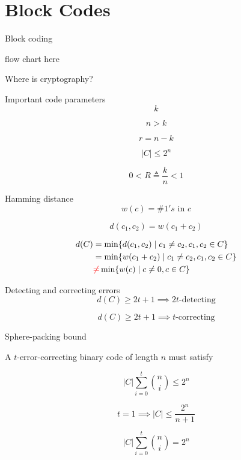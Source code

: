 \section{Block Codes}

\begin{frame}{Block coding}
  \centerline{flow chart here}

  \centerline{Where is cryptography?}
\end{frame}
\begin{frame}{Important code parameters}
  \[
	k
  \]

  \[
	n > k
  \]

  \[
	r = n - k
  \]

  \[
	|C| \le 2^n
  \]

  \[
	0 < R \triangleq \frac{k}{n} < 1
  \]
\end{frame}
\begin{frame}{Hamming distance}
  \[
	w(c) = \# 1's \text{ in } c
  \]

  \[
	d(c_1, c_2) = w(c_1 + c_2)
  \]

  \[
	\begin{aligned}
	  d(C) &= \min \{d(c_1, c_2) \mid c_1 \neq c_2, c_1, c_2 \in C\} \\
	  &= \min \{w(c_1 + c_2) \mid c_1 \neq c_2, c_1, c_2 \in C\} \\
	  &\textcolor{red}{\neq} \min \{w(c) \mid c \neq 0, c \in C\}
	\end{aligned}
  \]
\end{frame}
\begin{frame}{Detecting and correcting errors}
  \[
	d(C) \ge 2t + 1 \implies 2t\text{-detecting}
  \]

  \[
	d(C) \ge 2t + 1 \implies t\text{-correcting}
  \]
\end{frame}
\begin{frame}{Sphere-packing bound}
  \begin{theorem}
	A $t$-error-correcting binary code of length $n$ must satisfy

	\[
	  |C| \sum_{i=0}^{t} \binom{n}{i} \le 2^n
	\]
  \end{theorem}

  \[
	t = 1 \implies |C| \le \frac{2^n}{n + 1}
  \]

  \begin{definition}
	\[
	  |C| \sum_{i=0}^{t} \binom{n}{i} = 2^n
	\]
  \end{definition}
\end{frame}
